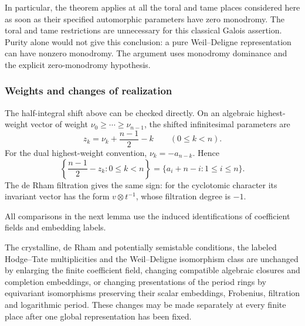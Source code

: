 In particular, the theorem applies at all the toral and tame
places considered here as soon as their specified automorphic
parameters have zero monodromy. The toral and tame restrictions
are unnecessary for this classical Galois assertion. Purity alone
would not give this conclusion: a pure Weil--Deligne
representation can have nonzero monodromy. The argument uses
monodromy dominance and the explicit zero-monodromy hypothesis.

\subsubsection{Weights and changes of realization}

The half-integral shift above can be checked directly. On an
algebraic highest-weight vector of weight
$\nu_0\geq\cdots\geq\nu_{n-1}$, the shifted infinitesimal
parameters are
\[
 z_k=\nu_k+\frac{n-1}{2}-k\qquad(0\leq k<n).
\]
For the dual highest-weight convention,
$\nu_k=-a_{n-k}$. Hence
\[
 \left\{\frac{n-1}{2}-z_k:0\leq k<n\right\}
       =\{a_i+n-i:1\leq i\leq n\}.
\]
The de Rham filtration gives the same sign: for the cyclotomic
character its invariant vector has the form $v\otimes t^{-1}$,
whose filtration degree is $-1$.

All comparisons in the next lemma use the induced identifications of
coefficient fields and embedding labels.

\begin{lemma}\label{lem-galois-period-realizations}
The crystalline, de Rham and potentially semistable conditions,
the labeled Hodge--Tate multiplicities and the Weil--Deligne
isomorphism class are unchanged by enlarging the finite
coefficient field, changing compatible algebraic closures and
completion embeddings, or changing presentations of the period
rings by equivariant isomorphisms preserving their scalar
embeddings, Frobenius, filtration and logarithmic period.
These changes may be made separately at every finite place
after one global representation has been fixed.
\end{lemma}

